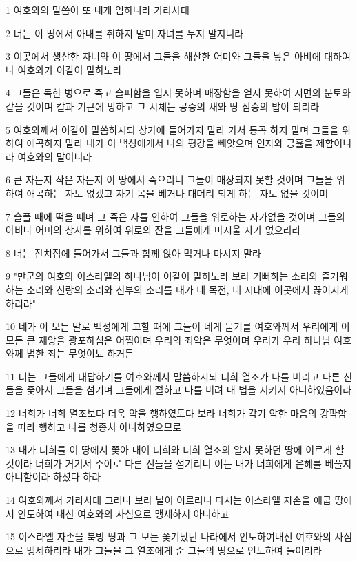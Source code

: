 \par 1 여호와의 말씀이 또 내게 임하니라 가라사대
\par 2 너는 이 땅에서 아내를 취하지 말며 자녀를 두지 말지니라
\par 3 이곳에서 생산한 자녀와 이 땅에서 그들을 해산한 어미와 그들을 낳은 아비에 대하여 나 여호와가 이같이 말하노라
\par 4 그들은 독한 병으로 죽고 슬퍼함을 입지 못하며 매장함을 얻지 못하여 지면의 분토와 같을 것이며 칼과 기근에 망하고 그 시체는 공중의 새와 땅 짐승의 밥이 되리라
\par 5 여호와께서 이같이 말씀하시되 상가에 들어가지 말라 가서 통곡 하지 말며 그들을 위하여 애곡하지 말라 내가 이 백성에게서 나의 평강을 빼앗으며 인자와 긍휼을 제함이니라 여호와의 말이니라
\par 6 큰 자든지 작은 자든지 이 땅에서 죽으리니 그들이 매장되지 못할 것이며 그들을 위하여 애곡하는 자도 없겠고 자기 몸을 베거나 대머리 되게 하는 자도 없을 것이며
\par 7 슬플 때에 떡을 떼며 그 죽은 자를 인하여 그들을 위로하는 자가없을 것이며 그들의 아비나 어미의 상사를 위하여 위로의 잔을 그들에게 마시울 자가 없으리라
\par 8 너는 잔치집에 들어가서 그들과 함께 앉아 먹거나 마시지 말라
\par 9 "만군의 여호와 이스라엘의 하나님이 이같이 말하노라 보라 기뻐하는 소리와 즐거워하는 소리와 신랑의 소리와 신부의 소리를 내가 네 목전, 네 시대에 이곳에서 끊어지게 하리라"
\par 10 네가 이 모든 말로 백성에게 고할 때에 그들이 네게 묻기를 여호와께서 우리에게 이 모든 큰 재앙을 광포하심은 어찜이며 우리의 죄악은 무엇이며 우리가 우리 하나님 여호와께 범한 죄는 무엇이뇨 하거든
\par 11 너는 그들에게 대답하기를 여호와께서 말씀하시되 너희 열조가 나를 버리고 다른 신들을 좇아서 그들을 섬기며 그들에게 절하고 나를 버려 내 법을 지키지 아니하였음이라
\par 12 너희가 너희 열조보다 더욱 악을 행하였도다 보라 너희가 각기 악한 마음의 강퍅함을 따라 행하고 나를 청종치 아니하였으므로
\par 13 내가 너희를 이 땅에서 쫓아 내어 너희와 너희 열조의 알지 못하던 땅에 이르게 할 것이라 너희가 거기서 주야로 다른 신들을 섬기리니 이는 내가 너희에게 은혜를 베풀지 아니함이라 하셨다 하라
\par 14 여호와께서 가라사대 그러나 보라 날이 이르리니 다시는 이스라엘 자손을 애굽 땅에서 인도하여 내신 여호와의 사심으로 맹세하지 아니하고
\par 15 이스라엘 자손을 북방 땅과 그 모든 쫓겨났던 나라에서 인도하여내신 여호와의 사심으로 맹세하리라 내가 그들을 그 열조에게 준 그들의 땅으로 인도하여 들이리라
